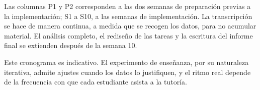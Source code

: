 \vspace{0.5em}

Las columnas P1 y P2 corresponden a las dos semanas de preparación previas a la implementación; S1 a S10, a las semanas de implementación. La transcripción se hace de manera continua, a medida que se recogen los datos, para no acumular material. El análisis completo, el rediseño de las tareas y la escritura del informe final se extienden después de la semana 10.

Este cronograma es indicativo. El experimento de enseñanza, por su naturaleza iterativa, admite ajustes cuando los datos lo justifiquen, y el ritmo real depende de la frecuencia con que cada estudiante asista a la tutoría.
